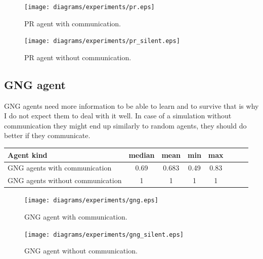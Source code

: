
\begin{figure}[h!]
  \centering                                
  \texttt{[image: diagrams/experiments/pr.eps]}    
  \caption{PR agent with communication.}
  \label{experiments:pr}
\end{figure} 

\begin{figure}[h!]
  \centering                                
  \texttt{[image: diagrams/experiments/pr\_silent.eps]}    
  \caption{PR agent without communication.}
  \label{experiments:pr-silent}
\end{figure} 

\subsection{GNG agent}

GNG agents need more information to be able to learn and to survive that is why I do not expect them to deal with it well. In case of a simulation without communication they might end up similarly to random agents, they should do better if they communicate.

\begin{center}   
  \begin{tabular}{l*{6}{c}r}
  Agent kind        & median & mean & min & max \\
  \hline  
  GNG agents with communication        & 0.69 & 0.683 & 0.49 & 0.83 \\
  GNG agents without communication        & 1 & 1 & 1 & 1 \\
  \end{tabular}                  
\end{center}


\begin{figure}[h!]
  \centering                                
  \texttt{[image: diagrams/experiments/gng.eps]}    
  \caption{GNG agent with communication.}
  \label{experiments:gng}
\end{figure} 

\begin{figure}[h!]
  \centering                                
  \texttt{[image: diagrams/experiments/gng\_silent.eps]}    
  \caption{GNG agent without communication.}
  \label{experiments:gng-silent}
\end{figure} 

